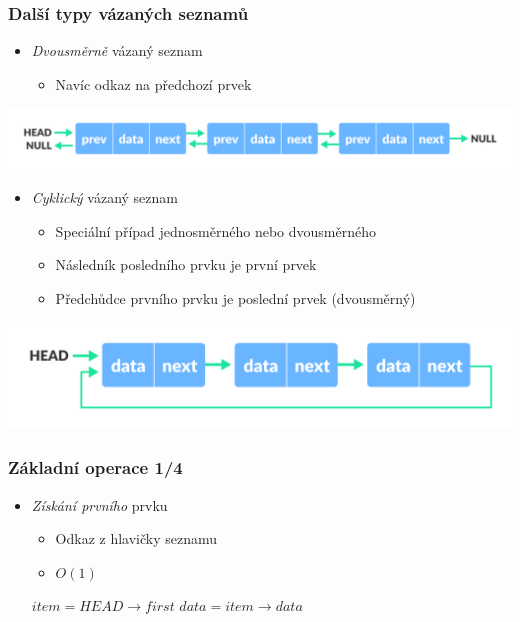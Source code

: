 \documentclass[10pt,xcolor=pdflatex,hyperref={unicode}]{beamer}
\begin{document}
\begin{frame}\frametitle{Další typy vázaných seznamů}
    \begin{itemize}
        \item \emph{Dvousměrně} vázaný seznam
            \begin{itemize}
                \item Navíc odkaz na předchozí prvek
            \end{itemize}
    \end{itemize}
    
    \centerline{\includegraphics[width=\textwidth]{img/doubly-linked-list-concept.png}}
    
    \pause
    
    \begin{itemize}
        \item \emph{Cyklický} vázaný seznam
            \begin{itemize}
                \item Speciální případ jednosměrného nebo dvousměrného
                \item Následník posledního prvku je první prvek
                \item Předchůdce prvního prvku je poslední prvek (dvousměrný)
            \end{itemize}
    \end{itemize}
    
    \centerline{\includegraphics[width=\textwidth]{img/circular-linked-list.png}}
\end{frame}

\begin{frame}[fragile]\frametitle{Základní operace 1/4}
    \begin{itemize}
        \item \emph{Získání prvního} prvku
            \begin{itemize}
                \item Odkaz z hlavičky seznamu
                \item $O(1)$
            \end{itemize}
        
        \begin{algorithm}[H]
            \renewcommand{\emph}[1]{\textit{#1}}
    	    $item = HEAD \rightarrow first$\;
    	    $data = item \rightarrow data$\;
        \end{algorithm}
    \end{itemize}
\end{frame}
\end{document}
